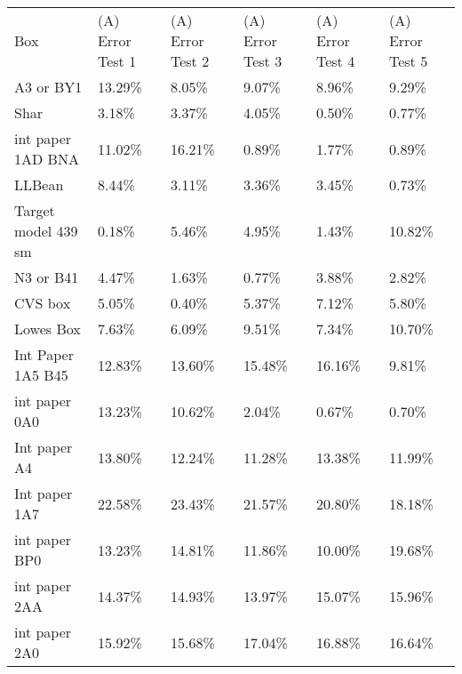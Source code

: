 \documentclass[11pt, twoside, reqno]{book}
\begin{document}
\begin{table}[]
	\centering
	
	\label{AR1El}
	\tiny
	\begin{tabular}{llllll}
		Box                 & (A) Error Test 1 & (A) Error Test 2 & (A) Error Test 3 & (A) Error Test 4 & (A) Error Test 5 \\
		A3 or BY1           & 13.29\%          & 8.05\%           & 9.07\%           & 8.96\%           & 9.29\%           \\
		Shar                & 3.18\%           & 3.37\%           & 4.05\%           & 0.50\%           & 0.77\%           \\
		int paper 1AD BNA   & 11.02\%          & 16.21\%          & 0.89\%           & 1.77\%           & 0.89\%           \\
		LLBean              & 8.44\%           & 3.11\%           & 3.36\%           & 3.45\%           & 0.73\%           \\
		Target model 439 sm & 0.18\%           & 5.46\%           & 4.95\%           & 1.43\%           & 10.82\%          \\
		N3 or B41           & 4.47\%           & 1.63\%           & 0.77\%           & 3.88\%           & 2.82\%           \\
		CVS box             & 5.05\%           & 0.40\%           & 5.37\%           & 7.12\%           & 5.80\%           \\
		Lowes Box           & 7.63\%           & 6.09\%           & 9.51\%           & 7.34\%           & 10.70\%          \\
		Int Paper 1A5 B45   & 12.83\%          & 13.60\%          & 15.48\%          & 16.16\%          & 9.81\%           \\
		int paper 0A0       & 13.23\%          & 10.62\%          & 2.04\%           & 0.67\%           & 0.70\%           \\
		Int paper A4        & 13.80\%          & 12.24\%          & 11.28\%          & 13.38\%          & 11.99\%          \\
		Int paper 1A7       & 22.58\%          & 23.43\%          & 21.57\%          & 20.80\%          & 18.18\%          \\
		int paper BP0       & 13.23\%          & 14.81\%          & 11.86\%          & 10.00\%          & 19.68\%          \\
		int paper 2AA       & 14.37\%          & 14.93\%          & 13.97\%          & 15.07\%          & 15.96\%          \\
		int paper 2A0       & 15.92\%          & 15.68\%          & 17.04\%          & 16.88\%          & 16.64\%          \\

\end{tabular}
\end{table}
\end{document}
